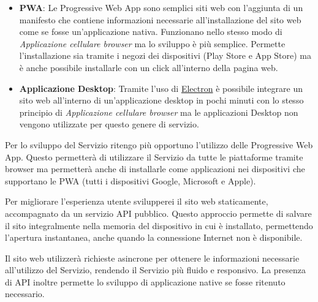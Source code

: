 \begin{itemize}
    \item \textbf{PWA}: Le Progressive Web App sono semplici siti web con l'aggiunta di un manifesto che contiene informazioni necessarie all'installazione del sito web come se fosse un'applicazione nativa. Funzionano nello stesso modo di \textit{Applicazione cellulare browser} ma lo sviluppo \`e pi\`u semplice. Permette l'installazione sia tramite i negozi dei dispositivi (Play Store e App Store) ma \`e anche possibile installarle con un click all'interno della pagina web.
    \item \textbf{Applicazione Desktop}: Tramite l'uso di \href{https://www.electronjs.org/}{Electron} \`e possibile integrare un sito web all'interno di un'applicazione desktop in pochi minuti con lo stesso principio di \textit{Applicazione cellulare browser} ma le applicazioni Desktop non vengono utilizzate per questo genere di servizio.
\end{itemize}

Per lo sviluppo del Servizio ritengo pi\`u opportuno l'utilizzo delle Progressive Web App. Questo permetter\`a di utilizzare il Servizio da tutte le piattaforme tramite browser ma permetter\`a anche di installarle come applicazioni nei dispositivi che supportano le PWA (tutti i dispositivi Google, Microsoft e Apple).

Per migliorare l'esperienza utente svilupperei il sito web staticamente, accompagnato da un servizio API pubblico. Questo approccio permette di salvare il sito integralmente nella memoria del dispositivo in cui \`e installato, permettendo l'apertura instantanea, anche quando la connessione Internet non \`e disponibile.

Il sito web utilizzer\`a richieste asincrone per ottenere le informazioni necessarie all'utilizzo del Servizio, rendendo il Servizio pi\`u fluido e responsivo. La presenza di API inoltre permette lo sviluppo di applicazione native se fosse ritenuto necessario.
